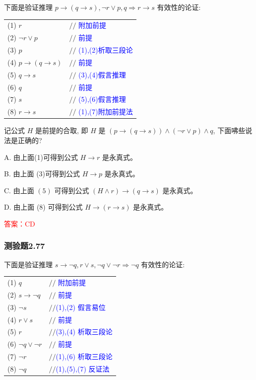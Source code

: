 \documentclass[UTF8, heading=true]{ctexart}
\begin{document}
下面是验证推理 $p \rightarrow(q \rightarrow s), \neg r \vee p, q \Longrightarrow r \rightarrow s$ 有效性的论证:

\begin{table}[htbp]
  \centering
  \renewcommand{\arraystretch}{1.8}
\begin{tabular}{ll} 
(1) $r$ & $/ /$ \textcolor{blue}{附加前提} \\
(2) $\neg r \vee p$ & $/ /$ \textcolor{blue}{前提} \\
(3) $p$ & $/ /$ \textcolor{blue}{(1),(2)析取三段论} \\
(4) $p \rightarrow(q \rightarrow s)$ & $/ /$ \textcolor{blue}{前提} \\
(5) $q \rightarrow s$ & $/ /$ \textcolor{blue}{(3),(4)假言推理} \\
(6) $q$ & $/ /$ \textcolor{blue}{前提} \\
(7) $s$ & $/ /$ \textcolor{blue}{(5),(6)假言推理} \\
(8) $r \rightarrow s$ & $/ /$ \textcolor{blue}{(1),(7)附加前提法}
\end{tabular}
\end{table}

记公式 $H$ 是前提的合取, 即 $H$ 是 $(p \rightarrow(q \rightarrow s)) \wedge(\neg r \vee p) \wedge q$, 下面咈些说法是正确的?

A. 由上面(1)可得到公式 $H \rightarrow r$ 是永真式。

B. 由上面 (3)可得到公式 $H \rightarrow p$ 是永真式。

C. 由上面 $(5)$ 可得到公式 $(H \wedge r) \rightarrow(q \rightarrow s)$ 是永真式。

D. 由上面 (8) 可得到公式 $H \rightarrow(r \rightarrow s)$ 是永真式。

\textcolor{red}{答案：CD}

\subsubsection{测验题2.77}

下面是验证推理 $s \rightarrow \neg q, r \vee s, \neg q \vee \neg r \Longrightarrow \neg q$ 有效性的论证:


\clearpage

\begin{table}[htbp]
  \centering
  \renewcommand{\arraystretch}{1.5}
\begin{tabular}{ll} 
(1) $q$ & $/ /$ \textcolor{blue}{附加前提} \\
(2) $s \rightarrow \neg q$ & $/ /$ \textcolor{blue}{前提} \\
(3) $\neg s$ & $/ /$\textcolor{blue}{(1),(2) 假言易位} \\
(4) $r \vee s$ & $/ /$ \textcolor{blue}{前提} \\
(5) $r$ & $/ /$\textcolor{blue}{(3),(4) 析取三段论} \\
(6) $\neg q \vee \neg r$ & $/ /$ \textcolor{blue}{前提} \\
(7) $\neg r$ & $/ /$\textcolor{blue}{(1),(6) 析取三段论} \\
(8) $\neg q$ & $/ /$\textcolor{blue}{(1),(5),(7) 反证法}
\end{tabular}
\end{table}
\end{document}
